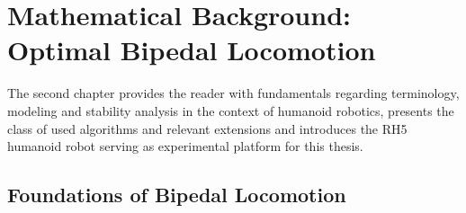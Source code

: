 
\chapter{Mathematical Background: Optimal Bipedal Locomotion}\label{c2}
The second chapter provides the reader with fundamentals regarding terminology, modeling and stability analysis in the context of humanoid robotics, presents the class of used algorithms and relevant extensions and introduces the RH5 humanoid robot serving as experimental platform for this thesis.

\section{Foundations of Bipedal Locomotion}
